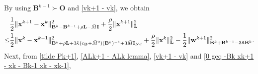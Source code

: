 \documentclass[10pt,a4paper]{amsart}
\begin{document}
By using $\mathbf{B}^{k-1}\succ \mathbf{O}$ and \eqref{vk+1 - vk}, we obtain
\begin{align}
	&\frac{1}{2}\|\mathbf{x}^{k+1} - \mathbf{x}^{k}\|^2_{\mathbf{B}^k-\mathbf{B}^{k-1}+\rho \mathbf{L}-\bar{M}\mathbf{I}}+\frac{\rho}{2}\|\mathbf{x}^{k+1}\|^2_{\mathbf{L}}\notag\\
	\leq& \frac{1}{2}\|\mathbf{x}^{k} - \mathbf{x}^{k-1}\|^2_{\mathbf{B}^k+\rho \mathbf{L}+3\tilde{\kappa}(c_{\mathbf{B}}+\bar{M}^2)(\mathbf{B}^k)^{-1}+3\bar{M}\mathbf{I}_{Nd}} + \frac{\rho}{2}\|\mathbf{x}^k\|^2_\mathbf{L}-\frac{1}{2}\|\mathbf{w}^{k+1}\|^2_{\mathbf{B}^k+\mathbf{B}^{k-1}-3\tilde{\kappa}\mathbf{B}^k}.\label{0 geq -Bk xk+1 - xk - Bk-1 xk - xk-1}
\end{align}
Next, from \eqref{tilde Pk+1}, \eqref{ALk+1 - ALk lemma}, \eqref{vk+1 - vk} and \eqref{0 geq -Bk xk+1 - xk - Bk-1 xk - xk-1},
\end{document}
